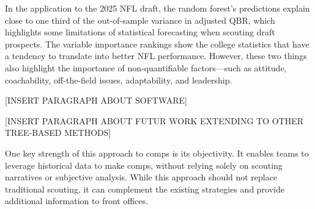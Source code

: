 \documentclass{article}
\begin{document}
In the application to the 2025 NFL draft, the random forest's predictions explain close to one third of the out-of-sample variance in adjusted QBR, which highlights some limitations of statistical forecasting when scouting draft prospects. The variable importance rankings show the college statistics that have a tendency to translate into better NFL performance. However, these two things also highlight the importance of non-quantifiable factors---such as attitude, coachability, off-the-field issues, adaptability, and leadership.

[INSERT PARAGRAPH ABOUT SOFTWARE]

[INSERT PARAGRAPH ABOUT FUTUR WORK EXTENDING TO OTHER TREE-BASED METHODS]

One key strength of this approach to comps is its objectivity. It enables teams to leverage historical data to make comps, without relying solely on scouting narratives or subjective analysis. While this approach should not replace traditional scouting, it can complement the existing strategies and provide additional information to front offices. 

\printbibliography
\end{document}
